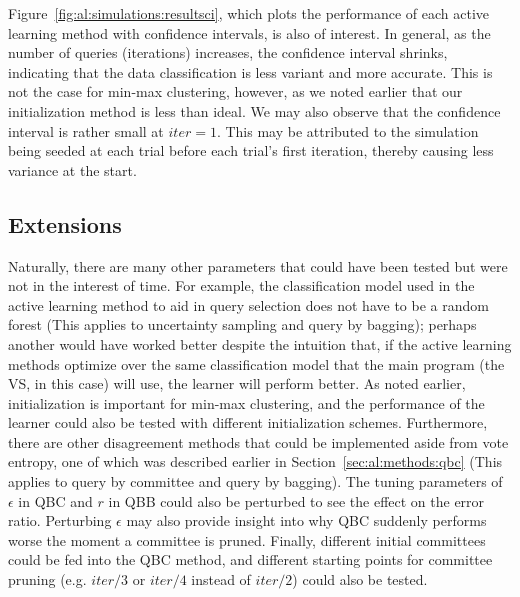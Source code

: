 Figure~\ref{fig:al:simulations:resultsci}, which plots the performance of each 
active learning method with confidence intervals, is also of interest. In 
general, as the number of queries (iterations) increases, the confidence 
interval shrinks, indicating that the data classification is less variant and 
more accurate. This is not the case for min-max clustering, however, as we 
noted earlier that our initialization method is less than ideal. We may also 
observe that the confidence interval is rather small at $iter = 1$. 
This may be attributed to the simulation being seeded at each trial before each
trial's first iteration, thereby causing less variance at the start.

\subsection{Extensions}
\label{sec:al:extensions}

Naturally, there are many other parameters that could have been tested but were 
not in the interest of time. For 
example, the classification model used in the active learning method to aid in 
query selection does not have to be a random forest 
(This applies to uncertainty sampling and query by bagging); perhaps another 
would have worked better despite 
the intuition that, if the active learning methods optimize over the same 
classification model that the main program (the VS, in this case) will use, the 
learner will perform better. As noted earlier, initialization is important for 
min-max clustering, and the performance of the learner could also be tested 
with different initialization 
schemes. Furthermore, there are other disagreement methods 
that could be implemented aside from vote entropy, one of which was described 
earlier in Section~\ref{sec:al:methods:qbc} (This applies to query by committee 
and query by bagging). The tuning parameters of $\epsilon$ in QBC and $r$ in 
QBB could also be perturbed to see the effect on the error ratio. Perturbing 
$\epsilon$ may also provide insight into why QBC suddenly performs worse the 
moment a committee is pruned. Finally, 
different initial committees could be fed into the QBC method, and different 
starting points for committee pruning (e.g. $iter/3$ or $iter/4$ instead of 
$iter/2$) could also 
be tested.